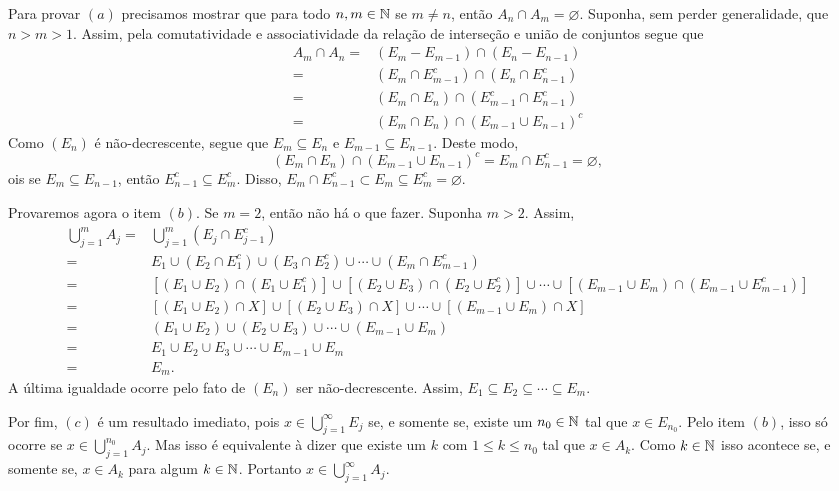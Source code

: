 \begin{prova}
    Para provar $(a)$ precisamos mostrar que para todo $n,m \in \operatorname{\mathbb{N}}$ se $m \neq n$, então $A_n \cap A_m = \varnothing$.
    Suponha, sem perder generalidade, que $n > m > 1$.
    Assim, pela comutatividade e associatividade da relação de interseção e união de conjuntos segue que
    \begin{align*}
        A_m\cap A_n =& (E_m - E_{m -1}) \cap (E_n - E_{n -1})\\
        =& (E_m \cap E_{m -1}^c) \cap (E_n \cap E_{n -1}^c)\\
        =& (E_m \cap E_n) \cap ( E_{m -1}^c\cap E_{n -1}^c)\\
        =& (E_m \cap E_n) \cap \left( E_{m -1}\cup E_{n -1}\right)^c
    \end{align*}
	Como $(E_n)$ é não-decrescente, segue que $E_m \subseteq E_n$ e $E_{m-1}\subseteq E_{n-1}$.
    Deste modo, 
    $$
    (E_m \cap E_n) \cap \left( E_{m -1}\cup E_{n -1}\right)^c
    =
    E_m \cap E_{n-1}^c
    = \varnothing,
    $$
	ois se $E_{m} \subseteq E_{n-1}$, então $E_{n-1}^c \subseteq E_{m}^c$.
	Disso, 
	$
	E_{m} \cap E_{n-1}^c 
	\subset 
	E_{m} 
	\subseteq 
	E_{m}^c
	=\varnothing.
	$
    
    Provaremos agora o item $(b)$.
 	Se $m = 2$, então não há o que fazer.
 	Suponha $m > 2$.
 	Assim, 
 	\begin{align*}
 		\bigcup_{j = 1}^m A_j
 		=&
 		\bigcup_{j = 1}^m(E_j\cap E_{j-1}^c)\\
 		=&
 		E_1 \cup (E_2\cap E_{1}^c) \cup (E_3\cap E_{2}^c) \cup \cdots
 		\cup (E_m\cap E_{m-1}^c)\\
 		=&
 		\left[(E_1 \cup E_2)\cap (E_1\cup E_{1}^c)\right]
 		\cup
 		\left[(E_2 \cup E_3)\cap (E_2\cup E_{2}^c)\right]
 		\cup
 		\cdots
 		\cup 
 		\left[(E_{m-1} \cup E_m)\cap (E_{m-1}\cup E_{m-1}^c)\right]\\
 		=&
 		\left[(E_1 \cup E_2)\cap X\right]
 		\cup
 		\left[(E_2 \cup E_3)\cap X\right]
 		\cup
 		\cdots
 		\cup 
 		\left[(E_{m-1} \cup E_m)\cap X\right]\\
 		=&
 		(E_1 \cup E_2)
 		\cup
 		(E_2 \cup E_3)
 		\cup
 		\cdots
 		\cup 
 		(E_{m-1} \cup E_m)\\
 		=&
 		E_1 \cup E_2 \cup E_3\cup 
 		\cdots
 		\cup E_{m-1} \cup E_m\\
 		=& E_m.
 	\end{align*}
	A última igualdade ocorre pelo fato de $(E_n)$ ser não-decrescente.
	Assim, $E_1 \subseteq E_2 \subseteq \cdots \subseteq E_m$.
	
    Por fim, $(c)$ é um resultado imediato, pois $ x \in \displaystyle \bigcup_{j = 1}^\infty E_j$ se, e somente se, 
    existe um $n_0 \in \operatorname{\mathbb{N}}$ tal que $x \in E_{n_0}$. 
    Pelo item $(b)$, isso só ocorre se $x \in \displaystyle \bigcup_{j = 1}^{n_0}A_j$.
    Mas isso é equivalente à dizer que existe um $k$ com $1\leq k\leq n_0$ tal que $x \in A_k$.
    Como $k \in \operatorname{\mathbb{N}}$ isso acontece se, e somente se, $x \in A_k$ para algum $k \in \operatorname{\mathbb{N}}$.
    Portanto $x \in \displaystyle \bigcup_{j = 1}^\infty A_j$.
\end{prova}

